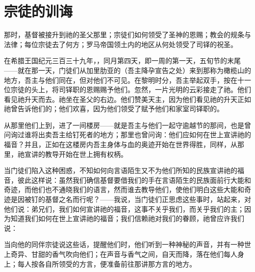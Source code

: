 
\chapter{宗徒的训诲}


那时，基督被接升到祂的圣父那里；宗徒们如何领受了圣神的恩赐；教会的规条与法律；每位宗徒去了何方；罗马帝国领土内的地区从何处领受了司铎的祝圣。\par

在希腊王国纪元三百三十九年，，同月第四天，即一周的第一天，五旬节的末尾——就在那一天，门徒们从加里肋亚的（吾主降孕宣告之处）来到那称为橄榄山的地方，吾主与他们同在，但对他们不可见。在黎明时分，吾主举起双手，按在十一位宗徒的头上，将司铎职的恩赐赐予他们。忽然，一片光明的云彩接走了祂。他们看见祂升天而去。祂坐在圣父的右边。他们赞美天主，因为他们看见祂的升天正如祂曾告诉他们的；他们欢喜，因为他们领受了赋予他们和家室司铎职的。\par

从那里他们上到，进了一间楼房——就是吾主与他们一起守逾越节的那间，也是曾问询过谁将出卖吾主给钉死者的地方；那里也曾问询：他们应如何在世上宣讲祂的福音？并且，正如在这楼房内吾主身体与血的奥迹开始在世界得胜，同样，从那里，祂宣讲的教导开始在世上拥有权柄。\par

当门徒们陷入这种困惑，不知如何向言语陌生又不为他们所知的民族宣讲祂的福音，彼此这样说：虽然我们确信基督要借我们的手在言语陌生的民族面前行大能和奇迹，而他们也不通晓我们的语言，然而谁去教导他们，使他们明白这些大能和奇迹是因被钉的基督之名而行呢？——我说，当门徒们正思虑这些事时，站起来，对他们说：弟兄们，我们如何宣讲祂的福音，这事不关乎我们，而关乎我们的主；因为知道我们如何在世上宣讲祂的福音；我们信赖祂对我们的眷顾，祂曾应许我们说：\par

当向他的同伴宗徒说这些话，提醒他们时，他们听到一种神秘的声音，并有一种世上奇异、甘甜的香气吹向他们；在声音与香气之间，自天而降，落在他们每人身上；每人按各自所领受的方言，便准备前往那讲那方言的地方。\par

